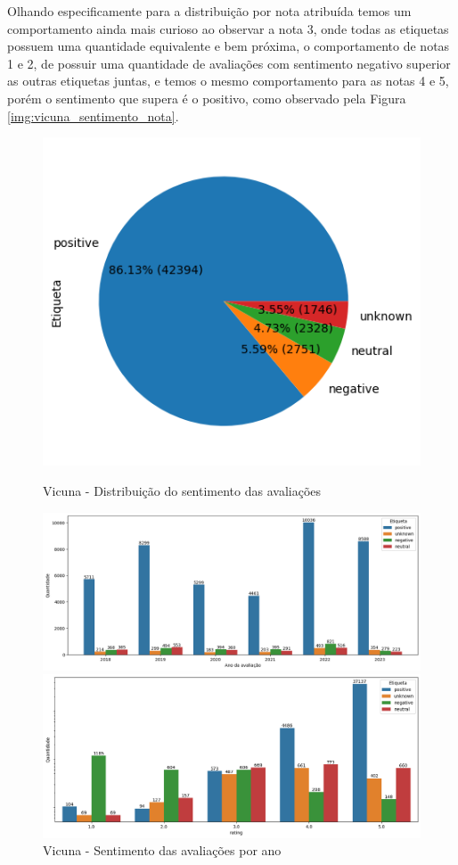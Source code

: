 Olhando especificamente para a distribuição por nota atribuída temos um comportamento ainda mais curioso ao observar a nota 3, onde todas as etiquetas possuem uma quantidade equivalente e bem próxima, o comportamento de notas 1 e 2, de possuir uma quantidade de avaliações com sentimento negativo superior as outras etiquetas juntas, e temos o mesmo comportamento para as notas 4 e 5, porém o sentimento que supera é o positivo, como observado pela Figura \ref{img:vicuna_sentimento_nota}.



\begin{figure}
	\centering
	\begin{minipage}{0.8\textwidth}
		\centering
		\includegraphics[width=.6\textwidth]{figs/vicuna/distribuicao_pizza.png}
		\caption{Vicuna - Distribuição do sentimento das avaliações}
		\label{img:vicuna_pizza_distribuicao}
	\end{minipage}\hfill
	\begin{minipage}{1\textwidth}
		\centering
		\includegraphics[width=1\textwidth]{figs/vicuna/sentimento_ano.png}
		\caption{Vicuna - Sentimento das avaliações por ano}
		\label{img:vicuna_sentimento_ano}
	\end{minipage}\hfill
	\begin{minipage}{1\textwidth}
		\centering
		\includegraphics[width=1\textwidth]{figs/vicuna/sentimento_nota.png}

\end{minipage}
\end{figure}
